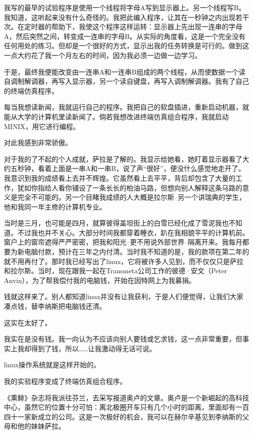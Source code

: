 我写的最早的试验程序是使用一个线程将字母A写到显示器上。另一个线程写B。我知道，这听起来没有什么奇怪的。我把此编入程序，让其在一秒钟之内出现若干次。在定时器的帮助下，我使这个程序这样运转：显示器上先出现一连串的字母A，然后突然之间，转变成一连串的字母B。从实际的角度看，这是一个完全没有任何用处的练习。但却是一个很好的方式，显示出我的任务转换是可行的。做到这一点大约花了我一个月左右的时间，因为我必须一边做一边学习。

于是，最终我便能改变由一连串A和一连串B组成的两个线程，从而使数据一个读自调制解调器，再写入显示器，另一个读自键盘，再写入调制解调器。我有了自己的终端仿真程序。

每当我想读新闻，我就运行自己的程序。我把自己的软盘插进，重新启动机器，就能从大学的计算机里读新闻了。倘若我想改进终端仿真组合程序，我就启动MINIX，用它进行编程。

对此我感到非常骄傲。

对于我的了不起的个人成就，萨拉是了解的。我显示给她看，她盯着显示器看了大约五秒钟，看着上面是一串A和一串B，说了声“很好”，便没什么感觉地走开了。我意识到我的成绩看上去并不辉煌。它虽然看上去平平，背后却包含了大量的工作，犹如你指给人看你铺设了一条长长的柏油马路，但想向别人解释这条马路的意义是完全不可能的。另一个目睹我成绩的人大概是拉尔斯--另一个讲瑞典的学生，他和我同一年主修的计算机专业。

当时是三月，也可能是四月，就算彼得盖坦街上的白雪已经化成了雪泥我也不知道。不过我也并不关心。大部分时间我都穿着睡衣，趴在我相貌平平的计算机前。窗户上的窗帘遮得严严密密，把我和阳光--更不用说外部世界--隔离开来。我每月都要为新电脑付款，预计在三年之内付清。当时我不知道的是，我的款项在第二年的就不用再付了。那时我已经写出了linux，它将被许多人见到，而不仅仅只是萨拉和拉尔斯。当时，现在跟我一起在Transmeta公司工作的彼德·安文（Peter Anvin），为了帮我偿付我的电脑钱，开始在因特网上为我募捐。

钱就这样来了。别人都知道linux并没有让我获利，于是人们便觉得，让我们大家凑点钱，替李纳斯把电脑钱还清。

这实在太好了。

我实在是没有钱。我一向认为不应该向别人要钱或乞求钱，这一点非常重要，但事实上我却得到了钱，所以……让我激动得无话可说。

linux操作系统就是这样开始的。

我的实验程序变成了终端仿真组合程序。

 

《熏鲱》杂志将我派往芬兰，去采写报道奥卢的文章。奥卢是一个新崛起的高科技中心，虽然它的位置十分可怕：离北极圈开车只有几个小时的距离，里面却有一百四十一家新成立的公司。这是一次极好的机会，我可以在赫尔辛基见到李纳斯的父母和他的妹妹萨拉。

